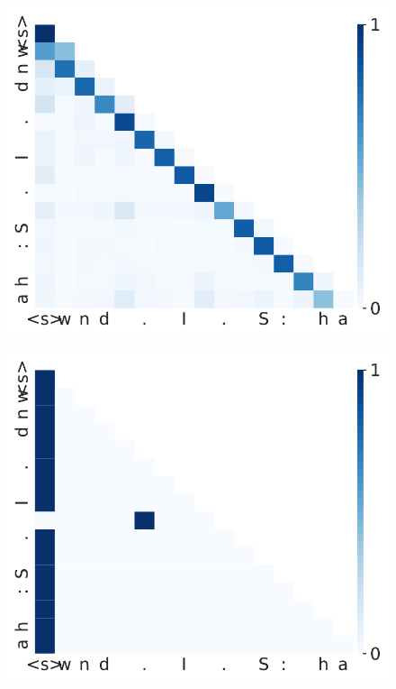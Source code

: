 \begin{figure}
\centering
  \begin{minipage}{0.45\textwidth}
      \centering
      \label{fig:appendix-biette-attn-weights-active-l0}
      \vspace{-.2em}
      \includegraphics[width=\linewidth]{Figures/figures_pretraining/Biette_attn_weights_seq1_layer0.pdf}
  \end{minipage}
  \hspace{-1em}
    \begin{minipage}{0.45\textwidth}
      \centering
      \label{fig:appendix-biette-attn-weights-active-l1}
      \vspace{-.2em}
      \includegraphics[width=\linewidth]{Figures/figures_pretraining/Biette_attn_weights_seq1_layer1.pdf}

\end{minipage}
\end{figure}
